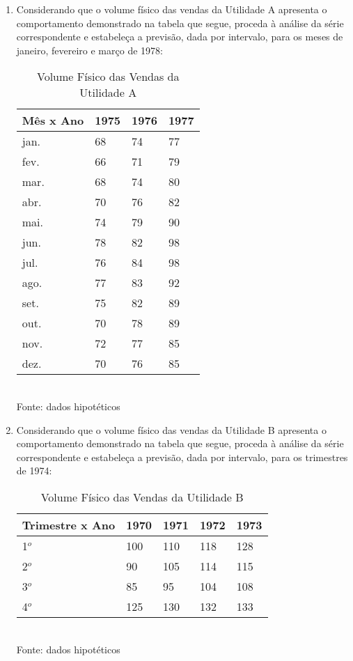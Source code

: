\begin{enumerate}[resume]
\item Considerando que o volume físico das vendas da Utilidade A apresenta o comportamento demonstrado na tabela que segue, proceda à análise da série correspondente e estabeleça a previsão, dada por intervalo, para os meses de janeiro, fevereiro e março de 1978:
	\begin{table}[!htb]
	\centering
	\caption{Volume Físico das Vendas da Utilidade A}
	\vspace{0.5cm}
	\begin{tabular}{llll}
	Mês x Ano & 1975 & 1976 & 1977 \\
	\hline 
	jan. & 68 & 74 & 77 \\
	fev. & 66 & 71 & 79 \\
	mar. & 68 & 74 & 80 \\
	abr. & 70 & 76 & 82 \\
	mai. & 74 & 79 & 90 \\
	jun. & 78 & 82 & 98 \\	
	jul. & 76 & 84 & 98 \\
	ago. & 77 & 83 & 92 \\
	set. & 75 & 82 & 89 \\
	out. & 70 & 78 & 89 \\
	nov. & 72 & 77 & 85 \\
	dez. & 70 & 76 & 85 \\					
	\end{tabular}\\
	Fonte: dados hipotéticos
	\end{table}
	
\item Considerando que o volume físico das vendas da Utilidade B apresenta o comportamento demonstrado na tabela que segue, proceda à análise da série correspondente e estabeleça a previsão, dada por intervalo, para os trimestres de 1974:
	\begin{table}[!htb]
	\centering
	\caption{Volume Físico das Vendas da Utilidade B}
	\vspace{0.5cm}
	\begin{tabular}{lllll}
	Trimestre x Ano & 1970 & 1971 & 1972 & 1973 \\
	\hline 
	1$^o$ & 100 & 110 & 118 & 128 \\
	2$^o$ & 90 & 105 & 114 & 115 \\
	3$^o$ & 85 & 95 & 104 & 108 \\
	4$^o$ & 125 & 130 & 132 & 133 \\	
	\end{tabular}\\
	Fonte: dados hipotéticos
	\end{table}	
	

\end{enumerate}
